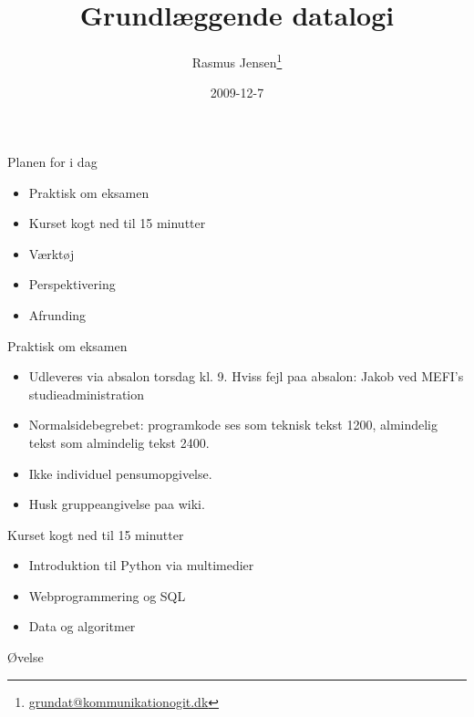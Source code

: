 \documentclass[a4paper,landscape]{slides}
\title{Grundlæggende datalogi}
\author{Rasmus Jensen\footnote{\url{grundat@kommunikationogit.dk}}}
\date{2009-12-7}
\begin{document}
\maketitle

\begin{slide} \begin{center} {\large 
Planen for i dag
} \end{center} \begin{itemize} \addtolength{\itemsep}{-\baselineskip}
   \item Praktisk om eksamen
   \item Kurset kogt ned til 15 minutter
   \item Værktøj
   \item Perspektivering
   \item Afrunding
\end{itemize} \end{slide} \begin{slide} \begin{center} {\large 
   Praktisk om eksamen
} \end{center} \begin{itemize} \addtolength{\itemsep}{-\baselineskip}
       \item  Udleveres via absalon torsdag kl. 9. Hviss fejl paa absalon: Jakob ved MEFI's studieadministration
       \item  Normalsidebegrebet: programkode ses som teknisk tekst 1200,  almindelig tekst som almindelig tekst 2400.
        \item Ikke individuel pensumopgivelse.
       \item  Husk gruppeangivelse paa wiki.
\end{itemize} \end{slide} \begin{slide} \begin{center} {\large 
Kurset kogt ned til 15 minutter
} \end{center} \begin{itemize} \addtolength{\itemsep}{-\baselineskip}
   \item Introduktion til Python via multimedier
   \item Webprogrammering og SQL
   \item Data og algoritmer
\end{itemize} \end{slide} \begin{slide} \begin{center} {\large 
    Øvelse
} \end{center} \begin{itemize} \addtolength{\itemsep}{-\baselineskip}

\end{itemize}
\end{slide}
\end{document}
